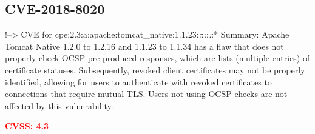 \documentclass[a4paper, 12pt]{article}
\begin{document}
\hypertarget{cve-2018-8020}{%
\subsection{CVE-2018-8020}\label{cve-2018-8020}}

!--\textgreater{} CVE for
cpe:2.3:a:apache:tomcat\_native:1.1.23:\emph{:}:\emph{:}:\emph{:}:*
Summary: Apache Tomcat Native 1.2.0 to 1.2.16 and 1.1.23 to 1.1.34 has a
flaw that does not properly check OCSP pre-produced responses, which are
lists (multiple entries) of certificate statuses. Subsequently, revoked
client certificates may not be properly identified, allowing for users
to authenticate with revoked certificates to connections that require
mutual TLS. Users not using OCSP checks are not affected by this
vulnerability.

\textbf{\textcolor{red}{CVSS: 4.3}}
\end{document}
